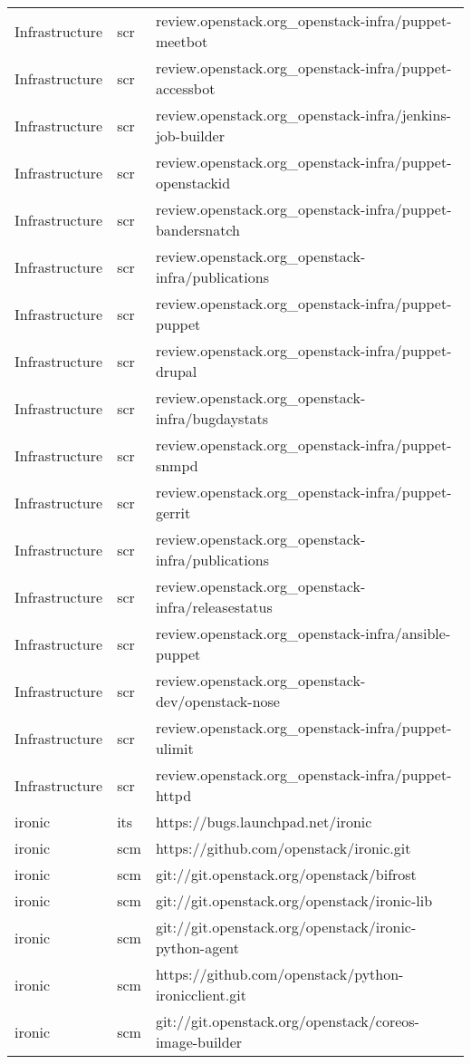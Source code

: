 \begin{center}
\begin{longtable}{|p{4cm}|p{1cm}|p{10cm}|}
Infrastructure&scr&review.openstack.org\_openstack-infra/puppet-meetbot\\ 
Infrastructure&scr&review.openstack.org\_openstack-infra/puppet-accessbot\\ 
Infrastructure&scr&review.openstack.org\_openstack-infra/jenkins-job-builder\\ 
Infrastructure&scr&review.openstack.org\_openstack-infra/puppet-openstackid\\ 
Infrastructure&scr&review.openstack.org\_openstack-infra/puppet-bandersnatch\\ 
Infrastructure&scr&review.openstack.org\_openstack-infra/publications\\ 
Infrastructure&scr&review.openstack.org\_openstack-infra/puppet-puppet\\ 
Infrastructure&scr&review.openstack.org\_openstack-infra/puppet-drupal\\ 
Infrastructure&scr&review.openstack.org\_openstack-infra/bugdaystats\\ 
Infrastructure&scr&review.openstack.org\_openstack-infra/puppet-snmpd\\ 
Infrastructure&scr&review.openstack.org\_openstack-infra/puppet-gerrit\\ 
Infrastructure&scr&review.openstack.org\_openstack-infra/publications\\ 
Infrastructure&scr&review.openstack.org\_openstack-infra/releasestatus\\ 
Infrastructure&scr&review.openstack.org\_openstack-infra/ansible-puppet\\ 
Infrastructure&scr&review.openstack.org\_openstack-dev/openstack-nose\\ 
Infrastructure&scr&review.openstack.org\_openstack-infra/puppet-ulimit\\ 
Infrastructure&scr&review.openstack.org\_openstack-infra/puppet-httpd\\ 
ironic&its&https://bugs.launchpad.net/ironic\\ 
ironic&scm&https://github.com/openstack/ironic.git\\ 
ironic&scm&git://git.openstack.org/openstack/bifrost\\ 
ironic&scm&git://git.openstack.org/openstack/ironic-lib\\ 
ironic&scm&git://git.openstack.org/openstack/ironic-python-agent\\ 
ironic&scm&https://github.com/openstack/python-ironicclient.git\\ 
ironic&scm&git://git.openstack.org/openstack/coreos-image-builder\\ 

\end{longtable}
\end{center}
